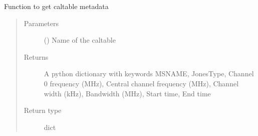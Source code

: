 \documentclass[letterpaper,10pt,english]{sphinxmanual}
\begin{document}
\begin{fulllineitems}
\label{\detokenize{paircars:paircars.basic_func.get_caltable_metadata}}
\sphinxAtStartPar
Function to get caltable metadata
\begin{quote}\begin{description}
\item[{Parameters}] \leavevmode
\sphinxAtStartPar
{} () \textendash{} Name of the caltable

\item[{Returns}] \leavevmode
\sphinxAtStartPar
A python dictionary with keywords MSNAME, JonesType, Channel 0 frequency (MHz), Central channel frequency (MHz), Channel width (kHz), Bandwidth (MHz), Start time, End time

\item[{Return type}] \leavevmode
\sphinxAtStartPar
dict

\end{description}\end{quote}

\end{fulllineitems}

\end{document}
